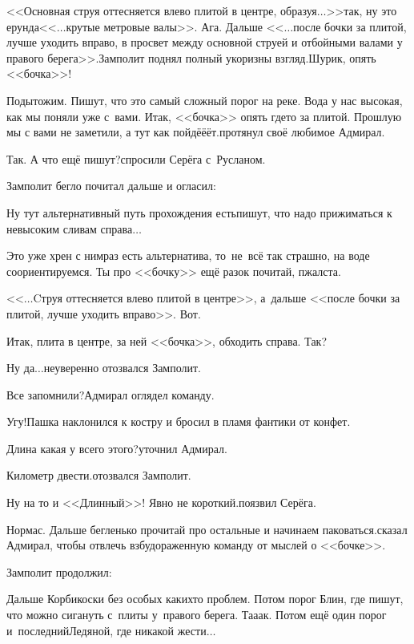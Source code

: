 \diagdash <<Основная струя оттесняется влево плитой в центре, образуя$\ldots$>>\mdash так, ну это ерунда\mdash <<$\ldots$крутые метровые валы>>. Ага. Дальше <<$\ldots$после бочки за плитой, лучше уходить вправо, в просвет между основной струей и отбойными валами у правого берега>>.\mdash Замполит поднял полный укоризны взгляд.\mdash Шурик, опять <<бочка>>!

\diagdash Подытожим. Пишут, что это самый сложный порог на реке. Вода у нас высокая, как мы поняли уже с~вами. Итак, <<бочка>> опять где\sdash то за плитой. Прошлую мы с вами не заметили, а тут как пойдё\sdash ё\sdash ёт.\mdash протянул своё любимое Адмирал.

\diagdash Так. А что ещё пишут?\mdash спросили Серёга с~Русланом.

Замполит бегло почитал дальше и огласил:

\diagdash Ну тут альтернативный путь прохождения есть\mdash пишут, что надо прижиматься к невысоким сливам справа$\ldots$

\diagdash Это уже хрен с ним\mdash раз есть альтернатива, то~не~всё так страшно, на воде соориентируемся. Ты про <<бочку>> ещё разок почитай, п\sdash жалста.

\diagdash <<$\ldots$Cтруя оттесняется влево плитой в центре>>, а~дальше <<после бочки за плитой, лучше уходить вправо>>. Вот.

\diagdash Итак, плита в центре, за ней <<бочка>>, обходить справа. Так?

\diagdash Ну да$\ldots$\mdash неуверенно отозвался Замполит.

\diagdash Все запомнили?\mdash Адмирал оглядел команду.

\diagdash Угу!\mdash Пашка наклонился к костру и бросил в пламя фантики от конфет.

\diagdash Длина какая у всего этого?\mdash уточнил Адмирал.

\diagdash Километр двести.\mdash отозвался Замполит.

\diagdash Ну на то и <<Длинный>>! Явно не короткий.\mdash поязвил Серёга.

\diagdash Нормас. Дальше бегленько прочитай про остальные и начинаем паковаться.\mdash сказал Адмирал, чтобы отвлечь взбудораженную команду от мыслей о <<бочке>>.

Замполит продолжил:

\diagdash Дальше Корбикоски без особых каких\sdash то проблем. Потом порог Блин, где пишут, что можно сигануть с~плиты у~правого берега. Та\sdash а\sdash ак. Потом ещё один порог и~последний\mdash Ледяной, где никакой жести$\ldots$

